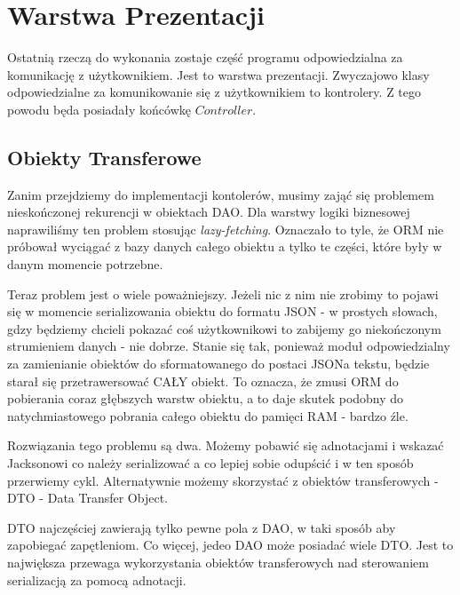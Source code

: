 \documentclass{article}
\begin{document}
    \section{Warstwa Prezentacji}
    
        Ostatnią rzeczą do wykonania zostaje część programu odpowiedzialna za komunikację z użytkownikiem. Jest to warstwa prezentacji. Zwyczajowo klasy odpowiedzialne za komunikowanie się z użytkownikiem to kontrolery. Z tego powodu będa posiadały końcówkę $Controller$.
        \subsection{Obiekty Transferowe}
            Zanim przejdziemy do implementacji kontolerów, musimy zająć się problemem nieskończonej rekurencji w obiektach DAO. Dla warstwy logiki biznesowej naprawiliśmy ten problem stosując \emph{lazy-fetching}. Oznaczało to tyle, że ORM nie próbował wyciągać z bazy danych całego obiektu a tylko te części, które były w danym momencie potrzebne. 
            
            Teraz problem jest o wiele poważniejszy. Jeżeli nic z nim nie zrobimy to pojawi się w momencie serializowania obiektu do formatu JSON - w prostych słowach, gdzy będziemy chcieli pokazać coś użytkownikowi to zabijemy go niekończonym strumieniem danych - nie dobrze. Stanie się tak, ponieważ moduł odpowiedzialny za zamienianie obiektów do sformatowanego do postaci JSONa tekstu, będzie starał się przetrawersować CAŁY obiekt. To oznacza, że zmusi ORM do pobierania coraz głębszych warstw obiektu, a to daje skutek podobny do natychmiastowego pobrania całego obiektu do pamięci RAM - bardzo źle. 
            
            Rozwiązania tego problemu są dwa. Możemy pobawić się adnotacjami i wskazać Jacksonowi co należy serializować a co lepiej sobie odupścić i w ten sposób przerwiemy cykl. Alternatywnie możemy skorzystać z obiektów transferowych - DTO - Data Transfer Object. 
            
            DTO najczęściej zawierają tylko pewne pola z DAO, w taki sposób aby zapobiegać zapętleniom. Co więcej, jedeo DAO może posiadać wiele DTO. Jest to największa przewaga wykorzystania obiektów transferowych nad sterowaniem serializacją za pomocą adnotacji.
            
\end{document}
